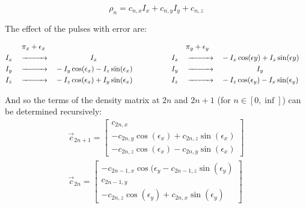 \documentclass[../PaulGanssle-Thesis.tex]{subfiles}
\begin{document}
\begin{equation}
\label{eqn:DensityMatrixAfterNMultiphase}
\rho_{n} = c_{n,x}I_{x} + c_{n,y}I_{y} + c_{n,z}
\end{equation}

The effect of the pulses with error are:

\begin{align*}
&       && \specialcell{\hfill{}\pi_{x} + \epsilon_{x}\hfill{}}  &&                                                    &\hspace*{15mm}&  && \pi_{y} + \epsilon_{y}     && & \\                                                           
& I_{x} && \xrightarrow{\hspace*{1cm}}                           && \specialcell{\hfill{}I_{x}\hfill{}}                && I_{x}         && \xrightarrow{\hspace*{1cm}} && -I_{x}\cos(\epsilon{y}) + I_{z}\sin(\epsilon{y}) &\\
& I_{y} && \xrightarrow{\hspace*{1cm}}                           && -I_{y}\cos(\epsilon_{x}) - I_{z}\sin(\epsilon_{x}) && I_{y}         && \xrightarrow{\hspace*{1cm}} && \specialcell{\hfill{}I_{y}\hfill{}} &\\
& I_{z} && \xrightarrow{\hspace*{1cm}}                           && -I_{z}\cos(\epsilon_{x}) + I_{y}\sin(\epsilon_{x}) && I_{z}         && \xrightarrow{\hspace*{1cm}} && -I_{z}\cos(\epsilon_{y}) - I_x\sin(\epsilon_{y})&
\end{align*}

And so the terms of the density matrix at $2n$ and $2n+1$ (for $n\in[0,\inf]$) can be determined recursively:
\begin{gather*}
\vec{c}_{2n+1} = 
\begin{bmatrix}
c_{2n,x} \\
-c_{2n,y}\cos(\epsilon_{x}) + c_{2n,z}\sin(\epsilon_{x}) \\
-c_{2n,z}\cos(\epsilon_{x}) - c_{2n,y}\sin(\epsilon_{x})
\end{bmatrix}\\
\vec{c}_{2n} = 
\begin{bmatrix}
-c_{2n-1,x}\cos(\epsilon_{y} - c_{2n-1,z}\sin(\epsilon_{y}) \\
c_{2n-1,y} \\
-c_{2n,z}\cos(\epsilon_{y}) + c_{2n,x}\sin(\epsilon_{y})
\end{bmatrix}
\end{gather*}
\end{document}
